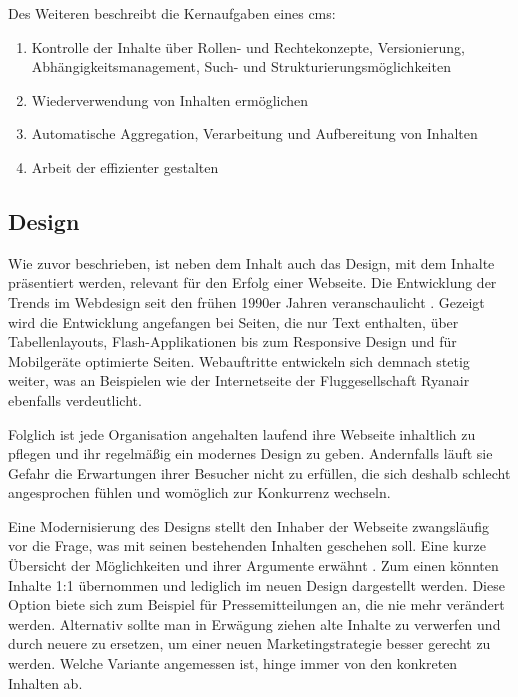             Des Weiteren beschreibt \cite[][Seite 9-12]{barker:webCMS} die Kernaufgaben eines \gls{cms}:
            \begin{enumerate}
                \item   Kontrolle der Inhalte über Rollen- und Rechtekonzepte,
                        Versionierung, Abhängigkeitsmanagement, Such- und Strukturierungsmöglichkeiten
                \item   Wiederverwendung von Inhalten ermöglichen
                \item   Automatische Aggregation, Verarbeitung und Aufbereitung von Inhalten
                \item   Arbeit der \editors effizienter gestalten
            \end{enumerate}

        \subsection{Design}
            Wie zuvor beschrieben, ist neben dem Inhalt auch das Design,
            mit dem Inhalte präsentiert werden, relevant für den Erfolg einer Webseite.
            Die Entwicklung der Trends im Webdesign seit den frühen 1990er Jahren veranschaulicht
            \cite{work:webDesignEvolution}.
            Gezeigt wird die Entwicklung angefangen bei Seiten, die nur Text enthalten,
            über Tabellenlayouts, Flash-Applikationen bis zum Responsive Design und für
            Mobilgeräte optimierte Seiten.
            Webauftritte entwickeln sich demnach stetig weiter,
            was \cite{murphy:webDesignEvolution} an Beispielen wie der Internetseite der
            Fluggesellschaft Ryanair ebenfalls verdeutlicht.

            Folglich ist jede Organisation angehalten laufend ihre Webseite inhaltlich zu pflegen
            und ihr regelmäßig ein modernes Design zu geben.
            Andernfalls läuft sie Gefahr die Erwartungen ihrer Besucher nicht zu erfüllen,
            die sich deshalb schlecht angesprochen fühlen und womöglich zur Konkurrenz wechseln.

            Eine Modernisierung des Designs stellt den Inhaber der Webseite zwangsläufig vor die Frage,
            was mit seinen bestehenden Inhalten geschehen soll.
            Eine kurze Übersicht der Möglichkeiten und ihrer Argumente erwähnt \cite{kahl:contentMigration}.
            Zum einen könnten Inhalte 1:1 übernommen und lediglich im neuen Design dargestellt werden.
            Diese Option biete sich zum Beispiel für Pressemitteilungen an, die nie mehr verändert werden.
            Alternativ sollte man in Erwägung ziehen alte Inhalte zu verwerfen und durch neuere
            zu ersetzen, um einer neuen Marketingstrategie besser gerecht zu werden.
            Welche Variante angemessen ist, hinge immer von den konkreten Inhalten ab.

